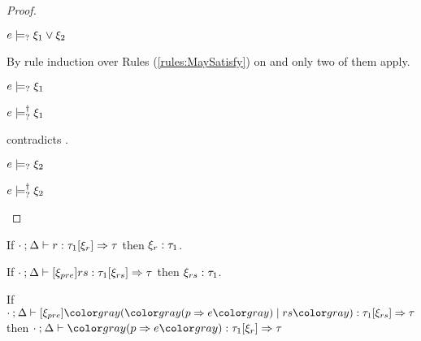 \begin{proof}
\begin{byCases}
  \item[\text{(\ref{rule:CSMSMay})}]
    \begin{pfsteps*}
    \item $e \models_{?} \xi_1 \vee \xi_2$  
    \end{pfsteps*}
    By rule induction over Rules (\ref{rules:MaySatisfy}) on  and only two of them apply.
    \begin{byCases}

    \item[\text{(\ref{rule:CMSOr1})}]
      \begin{pfsteps*}
      \item $e \models_{?} \xi_1$  
      \item $e \models_{?}^{\dag} \xi_1$  
      \end{pfsteps*}
       contradicts .

    \item[\text{(\ref{rule:CMSOr2})}]
      \begin{pfsteps*}
      \item $e \models_{?} \xi_2$  
      \item $e \models_{?}^{\dag} \xi_2$ 
      \end{pfsteps*}
    \end{byCases}
    \resetpfcounter
  \end{byCases}
\end{proof}

\begin{lem}
  \label{lem:rule-constraint-typ}
  If $\cdot \mathbin{;} \Delta \vdash r : \tau_1 [\xi_r] \Rightarrow \tau$ then $\xi_r : \tau_1$.
\end{lem}

\begin{lem}
  \label{lem:rules-constraint-typ}
  If $\cdot \mathbin{;} \Delta \vdash [\xi_{pre}] rs : \tau_1 [\xi_{rs}] \Rightarrow \tau$ then $\xi_{rs} : \tau_1$.
\end{lem}

\begin{lem}
  \label{lem:rules-rule-typ}
  If $\chrulstyp{\cdot}{\Delta}{\xi_{pre}}{\hrulesP{\hrulP{p}{e}}{rs}}{\tau_1}{\xi_{rs}}{\tau}$ \\
  then $\chrultyp{\cdot}{\Delta}{\hrulP{p}{e}}{\tau_1}{\xi_r}{\tau}$
\end{lem}

